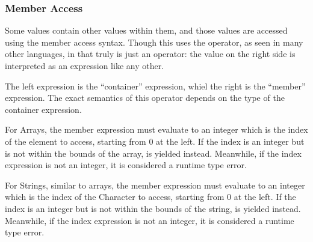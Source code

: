 \subsubsection{Member Access}
\label{sec:member-access}

Some values contain other values within them, and those values are accessed using
the member access syntax. Though this uses the  operator, as seen in many
other languages, in \Trilogy{} that  truly is just an operator: the value on
the right side is interpreted as an expression like any other.

\begin{bnf*}
\end{bnf*}

The left expression is the ``container'' expression, whiel the right is the
``member'' expression. The exact semantics of this operator depends on the
type of the container expression.

For Arrays, the member expression must evaluate to an integer
which is the index of the element to access, starting from 0 at the left.
If the index is an integer but is not within the bounds of the array,
 is yielded instead. Meanwhile, if the index expression is
not an integer, it is considered a runtime type error.

\begin{prooftree}
\end{prooftree}

\begin{prooftree}
\end{prooftree}

For Strings, similar to arrays, the member expression must evaluate
to an integer which is the index of the Character to access, starting from 0
at the left. If the index is an integer but is not within the bounds of the
string,  is yielded instead. Meanwhile, if the index expression
is not an integer, it is considered a runtime type error.

